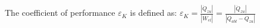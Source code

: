 The coefficient of performance \( \varepsilon_K \) is defined as:  
\( \varepsilon_K = \frac{|\dot{Q}_{zu}|}{|\dot{W}_{el}|} = \frac{|\dot{Q}_{zu}|}{|\dot{Q}_{abl} - \dot{Q}_{zu}|} \)